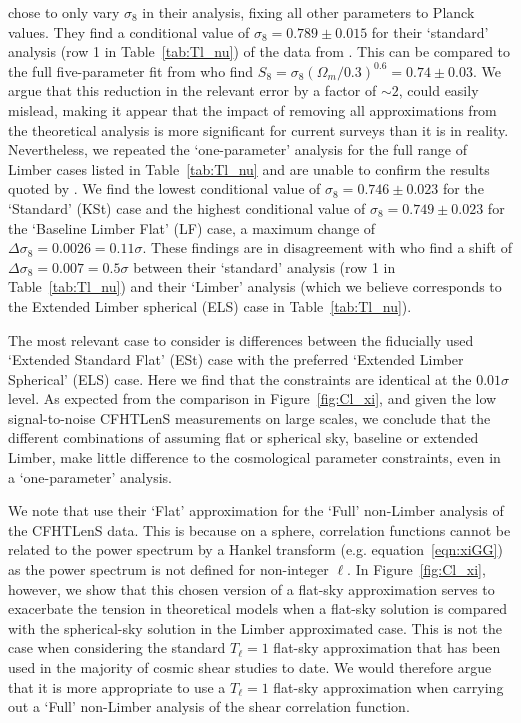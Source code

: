 \citet{kitching/etal:2016} chose to only vary $\sigma_8$ in their analysis, fixing all other parameters to Planck values. They find a conditional value of $\sigma_8 = 0.789 \pm 0.015$ for their `standard' analysis (row 1 in Table~\ref{tab:Tl_nu}) of the data from \citet{kilbinger/etal:2013}. This can be compared to the full five-parameter fit from \citet{kilbinger/etal:2013} who find $S_8=\sigma_8(\Omega_m/0.3)^{0.6} = 0.74 \pm 0.03$.   We argue that this reduction in the relevant error by a factor of $\sim 2$, could easily mislead, making it appear that the impact of removing all approximations from the theoretical analysis is more significant for current surveys than it is in reality.  Nevertheless, we repeated the `one-parameter' analysis for the full range of Limber cases listed in Table~\ref{tab:Tl_nu} and are unable to confirm the results quoted by \citet{kitching/etal:2016}.   We find the lowest conditional value of $\sigma_8 = 0.746 \pm 0.023$ for the `Standard' (KSt) case and the highest conditional value of $\sigma_8 = 0.749 \pm 0.023$ for the `Baseline Limber Flat' (LF) case, a maximum change of $\Delta \sigma_8 = 0.0026 = 0.11 \sigma$.  These findings are in disagreement with \citet{kitching/etal:2016} who find a shift of $\Delta \sigma_8 = 0.007 = 0.5\sigma$ between their `standard' analysis (row 1 in Table~\ref{tab:Tl_nu}) and their `Limber' analysis (which we believe corresponds to the Extended Limber spherical (ELS) case in Table~\ref{tab:Tl_nu}).  

The most relevant case to consider is differences between the fiducially used `Extended Standard Flat' (ESt) case with the preferred `Extended Limber Spherical' (ELS) case.  Here we find that the constraints are identical at the $0.01\sigma$ level.  As expected from the comparison in Figure~\ref{fig:Cl_xi}, and given the low signal-to-noise CFHTLenS measurements on large scales, we conclude that the different combinations of assuming flat or spherical sky, baseline or extended Limber, make little difference to the cosmological parameter constraints, even in a `one-parameter' analysis.    

We note that \citet{kitching/etal:2016} use their `Flat' approximation for the `Full' non-Limber analysis of the CFHTLenS data.   This is because on a sphere, correlation functions cannot be related to the power spectrum by a Hankel transform (e.g. equation~\ref{eqn:xiGG}) as the power spectrum is not defined for non-integer $\ell$.   In Figure~\ref{fig:Cl_xi}, however, we show that this chosen version of a flat-sky approximation serves to exacerbate the tension in theoretical models when a flat-sky solution is compared with the spherical-sky solution in the Limber approximated case.  This is not the case when considering the standard $T_\ell = 1$ flat-sky approximation that has been used in the majority of cosmic shear studies to date.  We would therefore argue that it is more appropriate to use a $T_\ell = 1$ flat-sky approximation when carrying out a `Full' non-Limber analysis of the shear correlation function.

